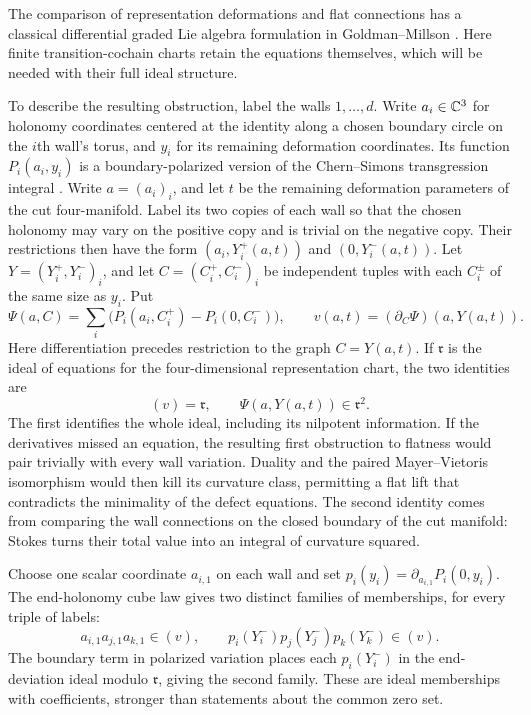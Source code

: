 The comparison of representation deformations and flat connections has
a classical differential graded Lie algebra formulation in
Goldman--Millson \cite[Proposition~2.6 and Section~6]{GM1988}.
Here finite transition-cochain charts retain the equations themselves,
which will be needed with their full ideal structure.

To describe the resulting obstruction, label the walls $1,\ldots,d$.
Write $a_i\in\mathbb C^3$ for holonomy coordinates centered at the identity
along a chosen boundary circle on the $i$th wall's torus, and $y_i$ for its remaining deformation
coordinates. Its function $P_i(a_i,y_i)$ is a boundary-polarized version
of the Chern--Simons transgression integral
\cite[Section~3]{ChernSimons1974}.
Write $a=(a_i)_i$, and let $t$ be the remaining deformation parameters
of the cut four-manifold. Label its two copies of each wall so that
the chosen holonomy may vary on the positive copy and is trivial on
the negative copy. Their restrictions then have the form
$(a_i,Y_i^+(a,t))$ and $(0,Y_i^-(a,t))$.
Let $Y=(Y_i^+,Y_i^-)_i$, and let $C=(C_i^+,C_i^-)_i$ be independent
tuples with each $C_i^\pm$ of the same size as $y_i$. Put
\[
 \Psi(a,C)=\sum_i\bigl(P_i(a_i,C_i^+)-P_i(0,C_i^-)\bigr),
 \qquad
 v(a,t)=(\partial_C\Psi)(a,Y(a,t)).
\]
Here differentiation precedes restriction to the graph $C=Y(a,t)$.
If $\mathfrak r$ is the ideal of equations for the four-dimensional
representation chart, the two identities are
\[
                  (v)=\mathfrak r,
           \qquad \Psi(a,Y(a,t))\in\mathfrak r^2.
\]
The first identifies the whole ideal, including its nilpotent
information. If the derivatives missed an equation, the resulting first
obstruction to flatness would pair trivially with every wall variation.
Duality and the paired Mayer--Vietoris isomorphism would then kill its
curvature class, permitting a flat lift that contradicts the minimality
of the defect equations. The second identity comes from comparing the wall
connections on the closed boundary of the cut manifold: Stokes turns
their total value into an integral of curvature squared.

Choose one scalar coordinate $a_{i,1}$ on each wall and set
$p_i(y_i)=\partial_{a_{i,1}}P_i(0,y_i)$. The end-holonomy cube law
gives two distinct families of memberships, for every triple of labels:
\[
 a_{i,1}a_{j,1}a_{k,1}\in(v),\qquad
 p_i(Y_i^-)p_j(Y_j^-)p_k(Y_k^-)\in(v).
\]
The boundary term in polarized variation places each $p_i(Y_i^-)$
in the end-deviation ideal modulo $\mathfrak r$, giving the second family.
These are ideal memberships with coefficients, stronger than statements
about the common zero set.

